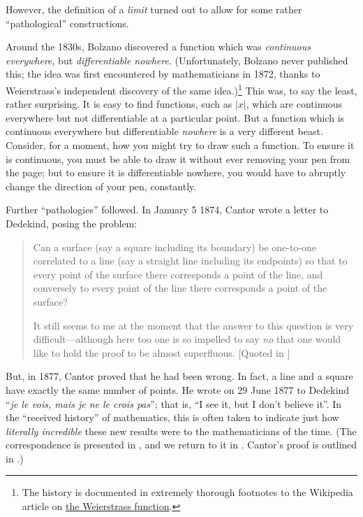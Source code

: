 \documentclass[../../../include/open-logic-section]{subfiles}
\begin{document}

However, the definition of a \emph{limit} turned out to allow for some rather ``pathological'' constructions. 

Around the 1830s, Bolzano discovered a function which was
\emph{continuous everywhere}, but \emph{differentiable nowhere}.
(Unfortunately, Bolzano never published this; the idea was first
encountered by mathematicians in 1872, thanks to Weierstrass's
independent discovery of the same idea.)\footnote{The history is
documented in extremely thorough footnotes to the Wikipedia article on
\href{http://en.wikipedia.org/wiki/Weierstrass_function}{the
Weierstrass function}.} This was, to say the least, rather surprising.
It is easy to find functions, such as $|x|$, which are continuous
everywhere but not differentiable at a particular point. But a
function which is continuous everywhere but differentiable
\emph{nowhere} is a very different beast. Consider, for a moment, how
you might try to draw such a function. To ensure it is continuous, you
must be able to draw it without ever removing your pen from the page;
but to ensure it is differentiable nowhere, you would have to abruptly
change the direction of your pen, constantly.

Further ``pathologies'' followed. In January 5 1874, Cantor wrote a
letter to Dedekind, posing the problem:
\begin{quote}
Can a surface (say a square including its boundary) be one-to-one
correlated to a line (say a straight line including its endpoints) so
that to every point of the surface there corresponds a point of the
line, and conversely to every point of the line there corresponds a
point of the surface?

It still seems to me at the moment that the answer to this question is
very difficult---although here too one is so impelled to say \emph{no}
that one would like to hold the proof to be almost superfluous.
[Quoted in \cite{Gouvea2011}]
\end{quote}
But, in 1877, Cantor proved that he had been wrong. In fact, a line
and a square have exactly the same number of points. He wrote on 29
June 1877 to Dedekind ``\emph{je le vois, mais je ne le crois pas}'';
that is, ``I see it, but I don't believe it''. In the ``received
history'' of mathematics, this is often taken to indicate just how
\emph{literally incredible} these new results were to the
mathematicians of the time. (The correspondence is presented in
\cite{Gouvea2011}, and we return to it in
. Cantor's proof is outlined in
.) 
\end{document}
